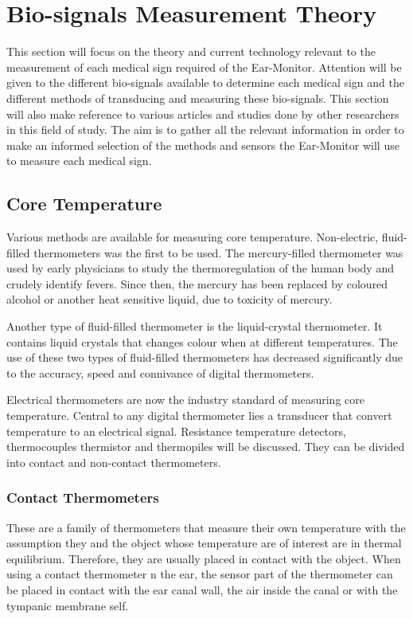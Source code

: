 \section{Bio-signals Measurement Theory} %
This section will focus on the theory and current technology relevant to the measurement of each medical sign required of the Ear-Monitor. Attention will be given to the different bio-signals available to determine each medical sign and the different methods of transducing and measuring these bio-signals. This section will also make reference to various articles and studies done by other researchers in this field of study. The aim is to gather all the relevant information in order to make an informed selection of the methods and sensors the Ear-Monitor will use to measure each medical sign.

\subsection{Core Temperature}
Various methods are available for measuring core temperature. Non-electric, fluid-filled thermometers was the first to be used. The mercury-filled thermometer was used by early physicians to study the thermoregulation of the human body and crudely identify fevers. Since then, the mercury has been replaced by coloured alcohol or another heat sensitive liquid, due to toxicity of mercury.

\medskip

Another type of fluid-filled thermometer is the liquid-crystal thermometer. It contains liquid crystals that changes colour when at different temperatures. The use of these two types of fluid-filled thermometers has decreased significantly due to the accuracy, speed and connivance of digital thermometers.

\medskip

Electrical thermometers are now the industry standard of measuring core temperature. Central to any digital thermometer lies a transducer that convert temperature to an electrical signal. Resistance temperature detectors, thermocouples thermistor and thermopiles will be discussed. They can be divided into contact and non-contact thermometers.

\subsubsection{Contact Thermometers}
These are a family of thermometers that measure their own temperature with the assumption they and the object whose temperature are of interest are in thermal equilibrium. Therefore, they are usually placed in contact with the object. When using a contact thermometer n the ear, the sensor part of the thermometer can be placed in contact with the ear canal wall, the air inside the canal or with the tympanic membrane self.

